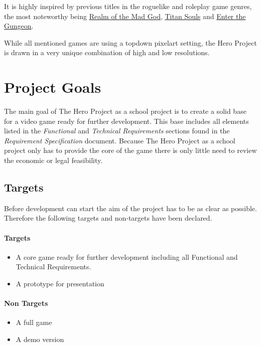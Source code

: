 \documentclass[11pt]{article}
\begin{document}
It is highly inspired by previous titles in the roguelike and roleplay game genres, the most noteworthy being \href{https://realmofthemadgod.com}{Realm of the Mad God}, \href{http://www.devolverdigital.com/games/view/titan-souls}{Titan Souls} and \href{http://dodgeroll.com/gungeon/}{Enter the Gungeon}.

While all mentioned games are using a topdown pixelart setting, the Hero Project is drawn in a very unique combination of high and low resolutions.

\newpage

\section{Project Goals}
The main goal of The Hero Project as a school project is to create a solid base for a video game ready for further development.
This base includes all elements listed in the \textit{Functional} and \textit{Technical Requirements} sections found in the \textit{Requirement Specification} document.
Because The Hero Project as a school project only has to provide the core of the game there is only little need to review the economic or legal feasibility.

\subsection{Targets}
Before development can start the aim of the project has to be as clear as possible. Therefore the following targets and non-targets have been declared.
\paragraph{Targets}
\begin{itemize}
 \item A core game ready for further development including all Functional and Technical Requirements.
 \item A prototype for presentation
\end{itemize}

\paragraph{Non Targets}
\begin{itemize}
 \item A full game
 \item A demo version
\end{itemize}
\end{document}
